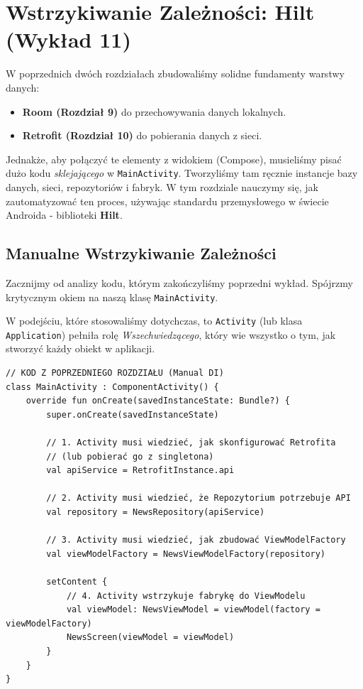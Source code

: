 \chapter{Wstrzykiwanie Zależności: Hilt (Wykład 11)}

W poprzednich dwóch rozdziałach zbudowaliśmy solidne fundamenty warstwy danych:
\begin{itemize}
    \item \textbf{Room (Rozdział 9)} do przechowywania danych lokalnych.
    \item \textbf{Retrofit (Rozdział 10)} do pobierania danych z sieci.
\end{itemize}

Jednakże, aby połączyć te elementy z widokiem (Compose), musieliśmy pisać dużo kodu \textit{sklejającego} w \texttt{MainActivity}. Tworzyliśmy tam ręcznie instancje bazy danych, sieci, repozytoriów i fabryk. W tym rozdziale nauczymy się, jak zautomatyzować ten proces, używając standardu przemysłowego w świecie Androida - biblioteki \textbf{Hilt}.

\section{Manualne Wstrzykiwanie Zależności}

Zacznijmy od analizy kodu, którym zakończyliśmy poprzedni wykład. Spójrzmy krytycznym okiem na naszą klasę \texttt{MainActivity}.

W podejściu, które stosowaliśmy dotychczas, to \texttt{Activity} (lub klasa \texttt{Application}) pełniła rolę \textit{Wszechwiedzącego}, który wie wszystko o tym, jak stworzyć każdy obiekt w aplikacji.

\begin{verbatim}
// KOD Z POPRZEDNIEGO ROZDZIAŁU (Manual DI)
class MainActivity : ComponentActivity() {
    override fun onCreate(savedInstanceState: Bundle?) {
        super.onCreate(savedInstanceState)
        
        // 1. Activity musi wiedzieć, jak skonfigurować Retrofita
        // (lub pobierać go z singletona)
        val apiService = RetrofitInstance.api
        
        // 2. Activity musi wiedzieć, że Repozytorium potrzebuje API
        val repository = NewsRepository(apiService)
        
        // 3. Activity musi wiedzieć, jak zbudować ViewModelFactory
        val viewModelFactory = NewsViewModelFactory(repository)

        setContent {
            // 4. Activity wstrzykuje fabrykę do ViewModelu
            val viewModel: NewsViewModel = viewModel(factory = viewModelFactory)
            NewsScreen(viewModel = viewModel)
        }
    }
}
\end{verbatim}

